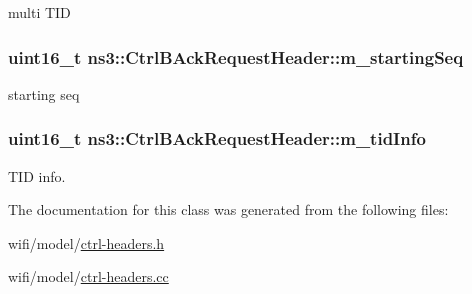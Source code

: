 multi T\+ID 

\subsubsection[{\texorpdfstring{m\+\_\+starting\+Seq}{m_startingSeq}}]{\setlength{\rightskip}{0pt plus 5cm}uint16\+\_\+t ns3\+::\+Ctrl\+B\+Ack\+Request\+Header\+::m\+\_\+starting\+Seq\hspace{0.3cm}{\ttfamily [private]}}\hypertarget{classns3_1_1CtrlBAckRequestHeader_a448a8dddb080c2b36573f5c39a8fe105}{}\label{classns3_1_1CtrlBAckRequestHeader_a448a8dddb080c2b36573f5c39a8fe105}


starting seq 

\subsubsection[{\texorpdfstring{m\+\_\+tid\+Info}{m_tidInfo}}]{\setlength{\rightskip}{0pt plus 5cm}uint16\+\_\+t ns3\+::\+Ctrl\+B\+Ack\+Request\+Header\+::m\+\_\+tid\+Info\hspace{0.3cm}{\ttfamily [private]}}\hypertarget{classns3_1_1CtrlBAckRequestHeader_a4ccda262169f8e459a1bd1bcff6ebb45}{}\label{classns3_1_1CtrlBAckRequestHeader_a4ccda262169f8e459a1bd1bcff6ebb45}


T\+ID info. 



The documentation for this class was generated from the following files\+:\begin{DoxyCompactItemize}
\item 
wifi/model/\hyperlink{ctrl-headers_8h}{ctrl-\/headers.\+h}\item 
wifi/model/\hyperlink{ctrl-headers_8cc}{ctrl-\/headers.\+cc}\end{DoxyCompactItemize}
